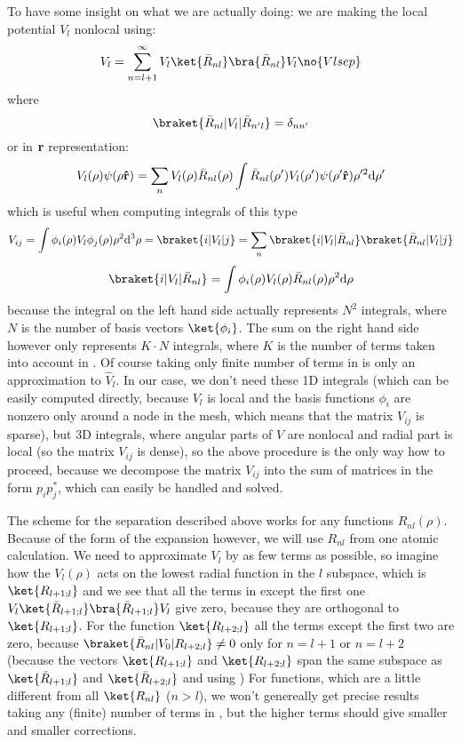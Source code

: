 To have some insight on what we are actually doing: we are making the local
potential $V_l$ nonlocal using:
$$V_l=\sum_{n=l+1}^\infty V_l\ket{\bar R_{nl}}\bra{\bar R_{nl}}V_l \no{Vlsep}$$
where
$$\braket{\bar R_{nl}|V_l|\bar R_{n'l}}=\delta_{nn'}$$
or in ${\bf r}$ representation:
$$V_l(\rho)\psi(\rho {\bf\hat r})=\sum_n V_l(\rho)\bar R_{nl}(\rho)
\int\bar R_{nl}(\rho')V_l(\rho')\psi(\rho'{\bf\hat r})\rho'^2{\rm d} \rho'$$
which is useful when computing integrals of this type
$$V_{ij}
=\int\phi_i(\rho) V_l \phi_j(\rho) \rho^2\d^3 \rho
=\braket{i|V_l|j}=
\sum_n \braket{i|V_l|{\bar R_{nl}}}\braket{\bar R_{nl}|V_l|j}
$$
$$\braket{i|V_l|{\bar R_{nl}}}=\int\phi_i(\rho)V_l(\rho)\bar R_{nl}(\rho)
\rho^2\d\rho$$
because the integral on the left hand side actually represents $N^2$ integrals,
where $N$ is the number of basis vectors $\ket{\phi_i}$. The sum on the
right hand side however only represents $K\cdot N$ integrals, where $K$ is the
number of terms taken into account in . Of course taking only finite
number of terms in  is only an approximation to $\hat V_l$. In our
case, we don't need these 1D integrals (which can be easily computed directly,
because $V_l$ is local and the basis functions $\phi_i$ are nonzero only around
a node in the mesh, which means that the matrix $V_{ij}$ is sparse), but 3D
integrals, where angular parts of $V$ are nonlocal and radial part is local (so
the matrix $V_{ij}$ is dense), so the above procedure is the only way how to
proceed, because we decompose the matrix $V_{ij}$ into the sum of matrices in
the form $p_ip_j^*$, which can easily be handled and solved.

The scheme for the separation described
above works for any functions $R_{nl}(\rho)$. 
Because of the form of the expansion
 however, we will use $R_{nl}$ from one atomic calculation.
We need to approximate $V_l$ by as few terms as
possible, 
so imagine how the $V_l(\rho)$ acts on the lowest radial function in the $l$
subspace, which is $\ket{R_{l+1;l}}$ and we see that all the terms in
 except the first one 
$V_l\ket{\bar R_{l+1;l}}\bra{\bar R_{l+1;l}}V_l$
give zero, because they are orthogonal to $\ket{R_{l+1;l}}$. For the function
$\ket{R_{l+2;l}}$ all the terms except the first two are zero, because
$\braket{\bar R_{nl}|V_0|R_{l+2;l}}\neq0$ only for $n=l+1$ or $n=l+2$ 
(because the vectors
$\ket{R_{l+1;l}}$ and $\ket{R_{l+2;l}}$ span the same subspace as
$\ket{\bar R_{l+1;l}}$ and $\ket{\bar R_{l+2;l}}$ and using )
For functions, which are a little different from all $\ket{R_{nl}}$ ($n>l$),
we won't genereally get precise results taking any (finite) number of terms
in , but the higher terms should give smaller and smaller
corrections.


